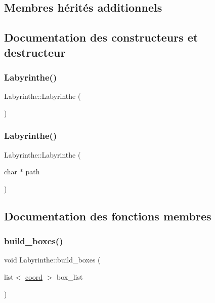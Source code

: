 \subsection*{Membres hérités additionnels}


\subsection{Documentation des constructeurs et destructeur}
\mbox{\label{classLabyrinthe_a46d8e42b8f59bf7e24ac7a967ac30e6e}} 
\subsubsection{\texorpdfstring{Labyrinthe()}{Labyrinthe()}\hspace{0.1cm}{\footnotesize\ttfamily [1/2]}}
{\footnotesize\ttfamily Labyrinthe\+::\+Labyrinthe (\begin{DoxyParamCaption}{ }\end{DoxyParamCaption})}

\mbox{\label{classLabyrinthe_a16aa4865644d59a8ed9fde15cd5e7275}} 
\subsubsection{\texorpdfstring{Labyrinthe()}{Labyrinthe()}\hspace{0.1cm}{\footnotesize\ttfamily [2/2]}}
{\footnotesize\ttfamily Labyrinthe\+::\+Labyrinthe (\begin{DoxyParamCaption}\item[{char $\ast$}]{path }\end{DoxyParamCaption})}



\subsection{Documentation des fonctions membres}
\mbox{\label{classLabyrinthe_a69718b426a9402cd578b2174d3b9389b}} 
\subsubsection{\texorpdfstring{build\+\_\+boxes()}{build\_boxes()}}
{\footnotesize\ttfamily void Labyrinthe\+::build\+\_\+boxes (\begin{DoxyParamCaption}\item[{list$<$ \hyperlink{structcoord}{coord} $>$}]{box\+\_\+list }\end{DoxyParamCaption})\hspace{0.3cm}{\ttfamily [private]}}



